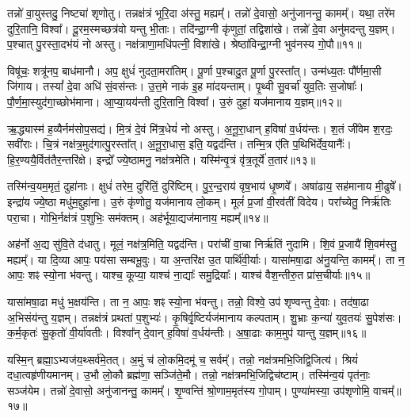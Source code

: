 तन्नो॑ वा॒युस्तदु॒ निष्ट्या॑ शृणोतु।
तन्नक्ष॑त्रं भूरि॒दा अ॑स्तु॒ मह्यम्᳚।
तन्नो॑ दे॒वासो॒ अनु॑जानन्तु॒ कामम्᳚।
यथा॒ तरे॑म दुरि॒तानि॒ विश्वा᳚।
दू॒रम॒स्मच्छत्र॑वो यन्तु भी॒ताः।
तदि॑न्द्रा॒ग्नी कृ॑णुतां॒ तद्विशा॑खे।
तन्नो॑ दे॒वा अनु॑मदन्तु य॒ज्ञम्।
प॒श्चात् पु॒रस्ता॒दभ॑यं नो अस्तु।
नक्ष॑त्राणा॒मधि॑पत्नी॒ विशा॑खे।
श्रेष्ठा॑विन्द्रा॒ग्नी भुव॑नस्य गो॒पौ॥११॥

विषू॑चः॒ शत्रू॑नप॒ बाध॑मानौ।
अप॒ क्षुधं॑ नुदता॒मरा॑तिम्।
पू॒र्णा प॒श्चादु॒त पू॒र्णा पु॒रस्ता᳚त्।
उन्म॑ध्य॒तः पौ᳚र्णमा॒सी जि॑गाय।
तस्यां᳚ दे॒वा अधि॑ सं॒वस॑न्तः।
उ॒त्त॒मे नाक॑ इ॒ह मा॑दयन्ताम्।
पृ॒थ्वी सु॒वर्चा॑ युव॒तिः स॒जोषाः᳚।
पौ॒र्ण॒मा॒स्युद॑गा॒च्छोभ॑माना।
आ॒प्या॒यय॑न्ती दुरि॒तानि॒ विश्वा᳚।
उ॒रुं दुहां॒ यज॑मानाय य॒ज्ञम्॥१२॥\anuvakamend[चि॒त्रभा॑नु॒र्यज॑माने दधातु ह॒विर्नः॒ पाथ॒श्चेतो॑ जुषन्ता॒ञ्चेतो॑ मदेम॒ रोच॑माना॒मरा॑तीर्गो॒पौ य॒ज्ञम्]

ऋ॒द्ध्यास्म॑ ह॒व्यैर्नम॑सोप॒सद्य॑।
मि॒त्रं दे॒वं मि॑त्र॒धेयं॑ नो अस्तु।
अ॒नू॒रा॒धान् ह॒विषा॑ व॒र्धय॑न्तः।
श॒तं जी॑वेम श॒रदः॒ सवी॑राः।
चि॒त्रं नक्ष॑त्र॒मुद॑गात्पु॒रस्ता᳚त्।
अ॒नू॒रा॒धास॒ इति॒ यद्वद॑न्ति।
तन्मि॒त्र ए॑ति प॒थिभि॑र्देव॒यानैः᳚।
हि॒र॒ण्ययै॒र्वित॑तै\-र॒न्तरि॑क्षे।
इन्द्रो᳚ ज्ये॒ष्ठामनु॒ नक्ष॑त्रमेति।
यस्मि॑न्वृ॒त्रं वृ॑त्र॒तूर्ये॑ त॒तार॑॥१३॥

तस्मि॑न्व॒यम॒मृतं॒ दुहा॑नाः।
क्षुधं॑ तरेम॒ दुरि॑तिं॒ दुरि॑ष्टिम्।
पु॒र॒न्द॒राय॑ वृष॒भाय॑ धृ॒ष्णवे᳚।
अषा॑ढाय॒ सह॑मानाय मी॒ढुषे᳚।
इन्द्रा॑य ज्ये॒ष्ठा मधु॑म॒द्दुहा॑ना।
उ॒रुं कृ॑णोतु॒ यज॑मानाय लो॒कम्।
मूलं॑ प्र॒जां वी॒रव॑तीं विदेय।
परा᳚च्येतु॒ निर्\mbox{}ऋ॑तिः परा॒चा।
गोभि॒र्नक्ष॑त्रं प॒शुभिः॒ सम॑क्तम्।
अह॑र्भूया॒द्यज॑मानाय॒ मह्यम्᳚॥१४॥

अह॑र्नो अ॒द्य सु॑वि॒ते द॑धातु।
मूलं॒ नक्ष॑त्र॒मिति॒ यद्वद॑न्ति।
परा॑चीं वा॒चा निर्\mbox{}ऋ॑तिं नुदामि।
शि॒वं प्र॒जायै॑ शि॒वम॑स्तु॒ मह्यम्᳚।
या दि॒व्या आपः॒ पय॑सा सम्बभू॒वुः।
या अ॒न्तरि॑क्ष उ॒त पार्थि॑वी॒र्याः।
यासा॑मषा॒ढा अ॑नु॒यन्ति॒ कामम्᳚।
ता न॒ आपः॒ शꣴ स्यो॒ना भ॑वन्तु।
याश्च॒ कूप्या॒ याश्च॑ ना॒द्याः᳚ समु॒द्रियाः᳚।
याश्च॑ वैश॒न्तीरु॒त प्रा॑स॒चीर्याः॥१५॥

यासा॑मषा॒ढा मधु॑ भ॒क्षय॑न्ति।
ता न॒ आपः॒ शꣴ स्यो॒ना भ॑वन्तु।
तन्नो॒ विश्वे॒ उप॑ शृण्वन्तु दे॒वाः।
तद॑षा॒ढा अ॒भिसंय॑न्तु य॒ज्ञम्।
तन्नक्ष॑त्रं प्रथतां प॒शुभ्यः॑।
कृ॒षिर्वृ॒ष्टिर्यज॑मानाय कल्पताम्।
शु॒भ्राः क॒न्या॑ युव॒तयः॑ सु॒पेश॑सः।
क॒र्म॒कृतः॑ सु॒कृतो॑ वी॒र्या॑वतीः।
विश्वा᳚न् दे॒वान् ह॒विषा॑ व॒र्धय॑न्तीः।
अ॒षा॒ढाः काम॒मुप॑ यान्तु य॒ज्ञम्॥१६॥

यस्मि॒न् ब्रह्मा॒\-ऽभ्यज॑य॒थ्सर्व॑मे॒तत्।
अ॒मुं च॑ लो॒कमि॒दमू॑ च॒ सर्वम्᳚।
तन्नो॒ नक्ष॑त्रमभि॒जिद्वि॒जित्य॑।
श्रियं॑ दधा॒त्वहृ॑णीय\-मानम्।
उ॒भौ लो॒कौ ब्रह्म॑णा॒ सञ्जि॑ते॒मौ।
तन्नो॒ नक्ष॑त्रमभि॒जिद्विच॑ष्टाम्।
तस्मि॑न्व॒यं पृत॑नाः॒ सञ्ज॑येम।
तन्नो॑ दे॒वासो॒ अनु॑जानन्तु॒ कामम्᳚।
शृ॒ण्वन्ति॑ श्रो॒णाम॒मृत॑स्य गो॒पाम्।
पुण्या॑मस्या॒ उप॑शृणोमि॒ वाचम्᳚॥१७॥


